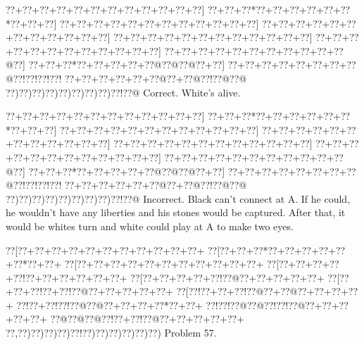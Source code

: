 \documentclass[a5paper]{article}
\begin{document}
\begin{center}
{\goo
\0??+\0??+\0??+\0??+\0??+\0??+\0??+\0??+\0??+\0??+\0??+\0??]
\0??+\0??+\0??*\0??+\0??+\0??+\0??+\0??+\0??*\0??+\0??+\0??]
\0??+\0??+\0??+\0??+\0??+\0??+\0??+\0??+\0??+\0??+\0??+\0??]
\0??+\0??+\0??+\0??+\0??+\0??+\0??+\0??+\0??+\0??+\0??+\0??]
\0??+\0??+\0??+\0??+\0??+\0??+\0??+\0??+\0??+\0??+\0??+\0??]
\0??+\0??+\0??+\0??+\0??+\0??+\0??+\0??+\0??+\0??+\0??+\0??]
\0??+\0??+\0??+\0??+\0??+\0??+\0??+\0??+\0??+\0??+\0??@\0??]
\0??+\0??+\0??*\0??+\0??+\0??+\0??+\0??@\0??@\0??@\0??+\0??]
\0??+\0??+\0??+\0??+\0??+\0??+\0??+\0??@\0??!\0??!\0??!\0??!
\0??+\0??+\0??+\0??+\0??+\0??@\0??+\0??@\0??!\0??@\0??@
\0??)\0??)\0??)\0??)\0??)\0??)\0??)\0??)\0??!\0??@
}
Correct. White's alive.

\end{center}
\begin{center}
{\goo
\0??+\0??+\0??+\0??+\0??+\0??+\0??+\0??+\0??+\0??+\0??+\0??]
\0??+\0??+\0??*\0??+\0??+\0??+\0??+\0??+\0??*\0??+\0??+\0??]
\0??+\0??+\0??+\0??+\0??+\0??+\0??+\0??+\0??+\0??+\0??+\0??]
\0??+\0??+\0??+\0??+\0??+\0??+\0??+\0??+\0??+\0??+\0??+\0??]
\0??+\0??+\0??+\0??+\0??+\0??+\0??+\0??+\0??+\0??+\0??+\0??]
\0??+\0??+\0??+\0??+\0??+\0??+\0??+\0??+\0??+\0??+\0??+\0??]
\0??+\0??+\0??+\0??+\0??+\0??+\0??+\0??+\0??+\0??+\0??@\0??]
\0??+\0??+\0??*\0??+\0??+\0??+\0??+\0??@\0??@\0??@\0??+\0??]
\0??+\0??+\0??+\0??+\0??+\0??+\0??+\0??@\0??!\0??!\0??!\0??!
\0??+\0??+\0??+\0??+\0??+\0??@\0??+\0??@\0??!\0??@\0??@
\0??)\0??)\0??)\0??)\0??)\0??)\0??)\0??)\0??!\0??@
}
Incorrect. Black can't connect at A. If he could, he wouldn't have any liberties and his stones would be captured. After that, it would be whites turn and white could play at A to make two eyes.

\end{center}
\newpage
\begin{center}
{\goo
\0??[\0??+\0??+\0??+\0??+\0??+\0??+\0??+\0??+\0??+\0??+\0??+
\0??[\0??+\0??+\0??*\0??+\0??+\0??+\0??+\0??+\0??*\0??+\0??+
\0??[\0??+\0??+\0??+\0??+\0??+\0??+\0??+\0??+\0??+\0??+\0??+
\0??[\0??+\0??+\0??+\0??+\0??!\0??+\0??+\0??+\0??+\0??+\0??+
\0??[\0??+\0??+\0??+\0??+\0??!\0??@\0??+\0??+\0??+\0??+\0??+
\0??[\0??+\0??+\0??!\0??+\0??!\0??@\0??+\0??+\0??+\0??+\0??+
\0??[\0??!\0??+\0??+\0??!\0??@\0??+\0??@\0??+\0??+\0??+\0??+
\0??!\0??+\0??!\0??!\0??@\0??@\0??+\0??+\0??+\0??*\0??+\0??+
\0??!\0??!\0??@\0??@\0??!\0??!\0??@\0??+\0??+\0??+\0??+\0??+
\0??@\0??@\0??@\0??!\0??+\0??!\0??@\0??+\0??+\0??+\0??+\0??+
\0??,\0??)\0??)\0??)\0??)\0??!\0??)\0??)\0??)\0??)\0??)\0??)
}
Problem 57.

\end{center}
\end{document}
